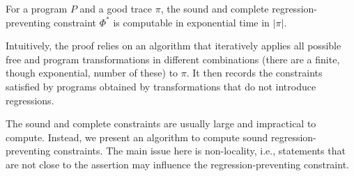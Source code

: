 \documentclass{llncs}
\newcommand\comment[1]{}
\newcommand\Prog{\ensuremath{\mathit{P}}}
\newcommand\ProgCons{\ensuremath{\Phi}}
\newcommand\trace{\pi}
\newcommand\arsays[1]{{\bf AR: #1}}
\begin{document}
\begin{lemma}
  \label{lem:learning_completeness}
  For a program $\Prog$ and a good trace $\trace$, the sound and
  complete regression-preventing constraint $\ProgCons^*$ is computable
  in exponential time in $\vert \trace \vert$.
\end{lemma}
Intuitively, the proof relies on an algorithm 
that iteratively applies all possible free
and program transformations in different combinations (there are a
finite, though exponential, number of these) to $\trace$.
It then records the constraints satisfied by programs obtained by
transformations that do not introduce regressions. 

\comment{
While the complexity is exponential, we can
show that this cost is unavoidable.
We do not present the proof here, but only state that
it is non-constructive and is based on Shannon's lower bounds on
circuit complexity for boolean functions.
\arsays{This is a bit shady: is there a family of boolean functions that
has poly size circuits/poly size turing machines, but a exponential size
formulae}
\begin{lemma}
  There exist a class of programs $\Prog_n$, and traces $\trace_n$ of
  length $O(n)$ such that the most-general regression-preventing
  constraint is of size $\Theta(\frac{2^n}{n})$.
\end{lemma}
}



The sound and complete constraints are usually large and
impractical to compute.
Instead, we present an algorithm to compute sound
regression-preventing constraints.
The main issue here is non-locality, i.e., statements that are not close
to the assertion may influence the regression-preventing constraint.
\end{document}
